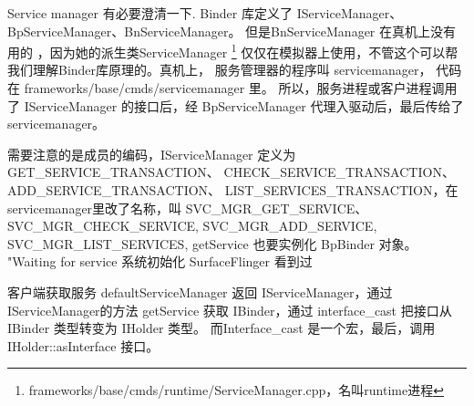 \documentclass[a4paper,11pt]{article}
\begin{document}
    Service manager 有必要澄清一下. Binder 库定义了 IServiceManager、
    BpServiceManager、BnServiceManager。 但是BnServiceManager 在真机上没有用的
    ，因为她的派生类ServiceManager
    \footnote{frameworks/base/cmds/runtime/ServiceManager.cpp，名叫runtime进程}
    仅仅在模拟器上使用，不管这个可以帮我们理解Binder库原理的。真机上， 服务管理器的程序叫 servicemanager， 代码在 
    frameworks/base/cmds/servicemanager 里。 所以，服务进程或客户进程调用了
    IServiceManager 的接口后，经 BpServiceManager 代理入驱动后，最后传给了
    servicemanager。

    需要注意的是成员的编码，IServiceManager 定义为 GET_SERVICE_TRANSACTION、
    CHECK_SERVICE_TRANSACTION、ADD_SERVICE_TRANSACTION、
    LIST_SERVICES_TRANSACTION，在servicemanager里改了名称，叫
    SVC_MGR_GET_SERVICE、SVC_MGR_CHECK_SERVICE, SVC_MGR_ADD_SERVICE, SVC_MGR_LIST_SERVICES,
getService 也要实例化 BpBinder 对象。
"Waiting for service    系统初始化 SurfaceFlinger 看到过



客户端获取服务
defaultServiceManager  返回 IServiceManager，通过 IServiceManager的方法 getService 获取 IBinder，通过 interface_cast 把接口从 IBinder 类型转变为 IHolder 类型。
而Interface_cast 是一个宏，最后，调用 IHolder::asInterface 接口。
\end{document}
